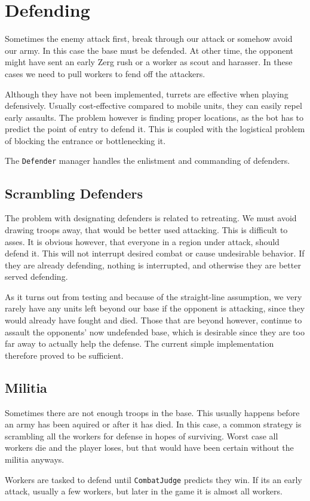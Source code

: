 \section{Defending}
Sometimes the enemy attack first, break through our attack or somehow avoid our army. In this case the base must be defended. At other time, the opponent might have sent an early Zerg rush or a worker as scout and harasser. In these cases we need to pull workers to fend off the attackers.

Although they have not been implemented, turrets are effective when playing defensively. Usually cost-effective compared to mobile units, they can easily repel early assaults. The problem however is finding proper locations, as the bot has to predict the point of entry to defend it. This is coupled with the logistical problem of blocking the entrance or bottlenecking it.

The \texttt{Defender} manager handles the enlistment and commanding of defenders.

	\subsection*{Scrambling Defenders}
	The problem with designating defenders is related to retreating. We must avoid drawing troops away, that would be better used attacking. This is difficult to asses. It is obvious however, that everyone in a region under attack, should defend it. This will not interrupt desired combat or cause undesirable behavior. If they are already defending, nothing is interrupted, and otherwise they are better served defending.
	
	As it turns out from testing and because of the straight-line assumption, we very rarely have any units left beyond our base if the opponent is attacking, since they would already have fought and died. Those that are beyond however, continue to assault the opponents' now undefended base, which is desirable since they are too far away to actually help the defense. The current simple implementation therefore proved to be sufficient.
	
	

	\subsection*{Militia}
	Sometimes there are not enough troops in the base. This usually happens before an army has been aquired or after it has died. In this case, a common strategy is scrambling all the workers for defense in hopes of surviving. Worst case all workers die and the player loses, but that would have been certain without the militia anyways.
	
	Workers are tasked to defend until \texttt{CombatJudge} predicts they win. If its an early attack, usually a few workers, but later in the game it is almost all workers.
	
	
